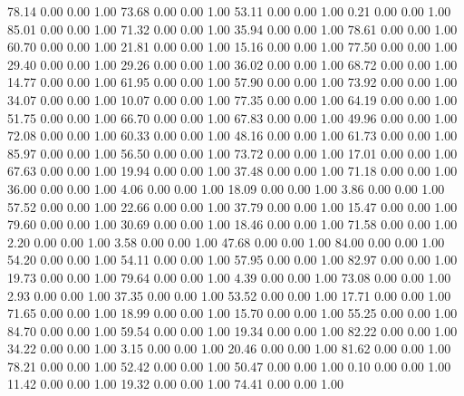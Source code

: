    78.14   0.00   0.00   1.00
   73.68   0.00   0.00   1.00
   53.11   0.00   0.00   1.00
    0.21   0.00   0.00   1.00
   85.01   0.00   0.00   1.00
   71.32   0.00   0.00   1.00
   35.94   0.00   0.00   1.00
   78.61   0.00   0.00   1.00
   60.70   0.00   0.00   1.00
   21.81   0.00   0.00   1.00
   15.16   0.00   0.00   1.00
   77.50   0.00   0.00   1.00
   29.40   0.00   0.00   1.00
   29.26   0.00   0.00   1.00
   36.02   0.00   0.00   1.00
   68.72   0.00   0.00   1.00
   14.77   0.00   0.00   1.00
   61.95   0.00   0.00   1.00
   57.90   0.00   0.00   1.00
   73.92   0.00   0.00   1.00
   34.07   0.00   0.00   1.00
   10.07   0.00   0.00   1.00
   77.35   0.00   0.00   1.00
   64.19   0.00   0.00   1.00
   51.75   0.00   0.00   1.00
   66.70   0.00   0.00   1.00
   67.83   0.00   0.00   1.00
   49.96   0.00   0.00   1.00
   72.08   0.00   0.00   1.00
   60.33   0.00   0.00   1.00
   48.16   0.00   0.00   1.00
   61.73   0.00   0.00   1.00
   85.97   0.00   0.00   1.00
   56.50   0.00   0.00   1.00
   73.72   0.00   0.00   1.00
   17.01   0.00   0.00   1.00
   67.63   0.00   0.00   1.00
   19.94   0.00   0.00   1.00
   37.48   0.00   0.00   1.00
   71.18   0.00   0.00   1.00
   36.00   0.00   0.00   1.00
    4.06   0.00   0.00   1.00
   18.09   0.00   0.00   1.00
    3.86   0.00   0.00   1.00
   57.52   0.00   0.00   1.00
   22.66   0.00   0.00   1.00
   37.79   0.00   0.00   1.00
   15.47   0.00   0.00   1.00
   79.60   0.00   0.00   1.00
   30.69   0.00   0.00   1.00
   18.46   0.00   0.00   1.00
   71.58   0.00   0.00   1.00
    2.20   0.00   0.00   1.00
    3.58   0.00   0.00   1.00
   47.68   0.00   0.00   1.00
   84.00   0.00   0.00   1.00
   54.20   0.00   0.00   1.00
   54.11   0.00   0.00   1.00
   57.95   0.00   0.00   1.00
   82.97   0.00   0.00   1.00
   19.73   0.00   0.00   1.00
   79.64   0.00   0.00   1.00
    4.39   0.00   0.00   1.00
   73.08   0.00   0.00   1.00
    2.93   0.00   0.00   1.00
   37.35   0.00   0.00   1.00
   53.52   0.00   0.00   1.00
   17.71   0.00   0.00   1.00
   71.65   0.00   0.00   1.00
   18.99   0.00   0.00   1.00
   15.70   0.00   0.00   1.00
   55.25   0.00   0.00   1.00
   84.70   0.00   0.00   1.00
   59.54   0.00   0.00   1.00
   19.34   0.00   0.00   1.00
   82.22   0.00   0.00   1.00
   34.22   0.00   0.00   1.00
    3.15   0.00   0.00   1.00
   20.46   0.00   0.00   1.00
   81.62   0.00   0.00   1.00
   78.21   0.00   0.00   1.00
   52.42   0.00   0.00   1.00
   50.47   0.00   0.00   1.00
    0.10   0.00   0.00   1.00
   11.42   0.00   0.00   1.00
   19.32   0.00   0.00   1.00
   74.41   0.00   0.00   1.00
